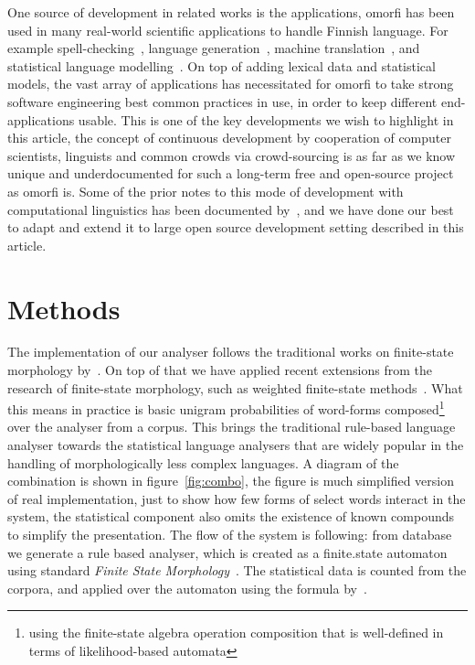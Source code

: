\documentclass[a4paper,12pt]{article}
\begin{document}
One source of development in related works is the applications, omorfi has
been used in many real-world scientific applications to handle Finnish
language.  For example spell-checking~\citep{pirinen2014weighted}, language
generation~\citep{toivanen2012corpus}, machine
translation~\citep{clifton2011combining,toral2015abumatran}, and statistical
language modelling~\citep{haverinen2013building,bohnet2013joint}. On top of
adding lexical data and statistical models, the vast array of applications
has necessitated for omorfi to take strong software engineering best common
practices in use, in order to keep different end-applications usable. This
is one of the key developments we wish to highlight in this article, the
concept of continuous development by cooperation of computer scientists,
linguists and common crowds via crowd-sourcing is as far as we know unique
and underdocumented for such a long-term free and open-source project as
omorfi is.  Some of the prior notes to this mode of development with
computational linguistics has been documented by~\citet{maxwell}, and
we have done our best to adapt and extend it to large open source
development setting described in this article.




\section{Methods}
\label{sec:methods}

The implementation of our analyser follows the traditional works on finite-state
morphology by~\citet{beesley2003finite}. On top of that we have applied recent
extensions from the research of finite-state morphology, such as weighted
finite-state methods~\citep{openfst,hfst2012}. What this means in practice is
basic unigram probabilities of word-forms composed\footnote{using the
    finite-state algebra operation composition that is well-defined in terms of
likelihood-based automata} over the analyser from a corpus.  This brings the
traditional rule-based language analyser towards the statistical language
analysers that are widely popular in the handling of morphologically less
complex languages. A diagram of the combination is shown in 
figure~\ref{fig:combo}, the figure is much simplified version of real
implementation, just to show how few forms of select words interact in the system, the
statistical component also omits the existence of known compounds to simplify
the presentation. The flow of the system is following: from database we generate
a rule based analyser, which is created as a finite.state automaton using
standard \textit{Finite State Morphology}~\citep{beesley2003finite}. The
statistical data is counted from the corpora, and applied over the automaton
using the formula by~\cite{pirinen}.
\end{document}
